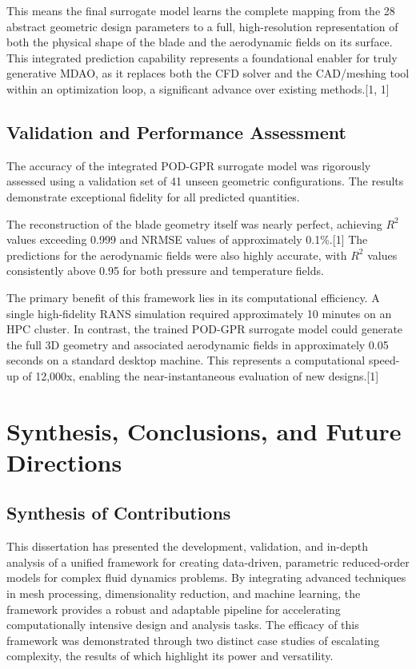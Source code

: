 \documentclass[12pt, a4paper]{report}
\begin{document}
This means the final surrogate model learns the complete mapping from the 28 abstract geometric design parameters to a full, high-resolution representation of both the physical shape of the blade and the aerodynamic fields on its surface. This integrated prediction capability represents a foundational enabler for truly generative MDAO, as it replaces both the CFD solver and the CAD/meshing tool within an optimization loop, a significant advance over existing methods.[1, 1]

\section{Validation and Performance Assessment}

The accuracy of the integrated POD-GPR surrogate model was rigorously assessed using a validation set of 41 unseen geometric configurations. The results demonstrate exceptional fidelity for all predicted quantities.

The reconstruction of the blade geometry itself was nearly perfect, achieving $R^2$ values exceeding 0.999 and NRMSE values of approximately 0.1\%.[1] The predictions for the aerodynamic fields were also highly accurate, with $R^2$ values consistently above 0.95 for both pressure and temperature fields.

The primary benefit of this framework lies in its computational efficiency. A single high-fidelity RANS simulation required approximately 10 minutes on an HPC cluster. In contrast, the trained POD-GPR surrogate model could generate the full 3D geometry and associated aerodynamic fields in approximately 0.05 seconds on a standard desktop machine. This represents a computational speed-up of 12,000x, enabling the near-instantaneous evaluation of new designs.[1]

\chapter{Synthesis, Conclusions, and Future Directions}

\section{Synthesis of Contributions}

This dissertation has presented the development, validation, and in-depth analysis of a unified framework for creating data-driven, parametric reduced-order models for complex fluid dynamics problems. By integrating advanced techniques in mesh processing, dimensionality reduction, and machine learning, the framework provides a robust and adaptable pipeline for accelerating computationally intensive design and analysis tasks. The efficacy of this framework was demonstrated through two distinct case studies of escalating complexity, the results of which highlight its power and versatility.
\end{document}
